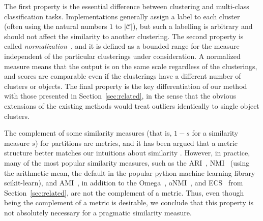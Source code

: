 \documentclass[11pt]{article}
\theoremstyle{remark}
\newcommand\cC{\mathcal C}
\begin{document}
The first property is the essential difference between clustering and multi-class classification tasks.
Implementations generally assign a label to each cluster (often using the natural numbers $1$ to $|\cC|$), but such a labelling is arbitrary and should not affect the similarity to another clustering.
The second property is called \textit{normalization}~\cite{ami}, and it is defined as a bounded range for the measure independent of the particular clusterings under consideration.
A normalized measure means that the output is on the same scale regardless of the clusterings, and scores are comparable even if the clusterings have a different number of clusters or objects.
The final property is the key differentiation of our method with those presented in Section~\ref{sec:related}, in the sense that the obvious extensions of the existing methods would treat outliers identically to single object clusters.

The complement of some similarity measures (that is, $1 - s$ for a similarity measure $s$) for partitions are metrics, and it has been argued that a metric structure better matches our intuitions about similarity \cite{vi}.
However, in practice, many of the most popular similarity measures, such as the ARI~\cite{ari}, NMI~\cite{nmi} (using the arithmetic mean, the default in the popular python machine learning library scikit-learn), and AMI~\cite{ami}, in addition to the Omega~\cite{omega}, oNMI~\cite{onmi}, and ECS~\cite{ecc} from Section~\ref{sec:related}, are not the complement of a metric.
Thus, even though being the complement of a metric is desirable, we conclude that this property is not absolutely necessary for a pragmatic similarity measure.
\end{document}
